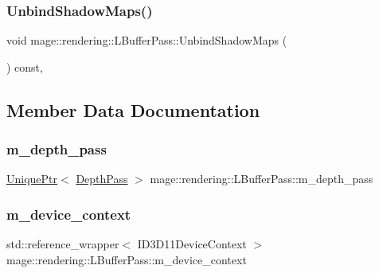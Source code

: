 \subsubsection{\texorpdfstring{Unbind\+Shadow\+Maps()}{UnbindShadowMaps()}}
{\footnotesize\ttfamily void mage\+::rendering\+::\+L\+Buffer\+Pass\+::\+Unbind\+Shadow\+Maps (\begin{DoxyParamCaption}{ }\end{DoxyParamCaption}) const\hspace{0.3cm}{\ttfamily [private]}, {\ttfamily [noexcept]}}



\subsection{Member Data Documentation}
\hypertarget{classmage_1_1rendering_1_1_l_buffer_pass_a0c721ac882c34c5d6fd6893407fa84f8}{}\label{classmage_1_1rendering_1_1_l_buffer_pass_a0c721ac882c34c5d6fd6893407fa84f8} 
\subsubsection{\texorpdfstring{m\+\_\+depth\+\_\+pass}{m\_depth\_pass}}
{\footnotesize\ttfamily \hyperlink{namespacemage_a3316d7143a973e37adf1110f2e80ca31}{Unique\+Ptr}$<$ \hyperlink{classmage_1_1rendering_1_1_depth_pass}{Depth\+Pass} $>$ mage\+::rendering\+::\+L\+Buffer\+Pass\+::m\+\_\+depth\+\_\+pass\hspace{0.3cm}{\ttfamily [private]}}

\hypertarget{classmage_1_1rendering_1_1_l_buffer_pass_adccb16b406d2020a7608512cc0f9e6d0}{}\label{classmage_1_1rendering_1_1_l_buffer_pass_adccb16b406d2020a7608512cc0f9e6d0} 
\subsubsection{\texorpdfstring{m\+\_\+device\+\_\+context}{m\_device\_context}}
{\footnotesize\ttfamily std\+::reference\+\_\+wrapper$<$ I\+D3\+D11\+Device\+Context $>$ mage\+::rendering\+::\+L\+Buffer\+Pass\+::m\+\_\+device\+\_\+context\hspace{0.3cm}{\ttfamily [private]}}

